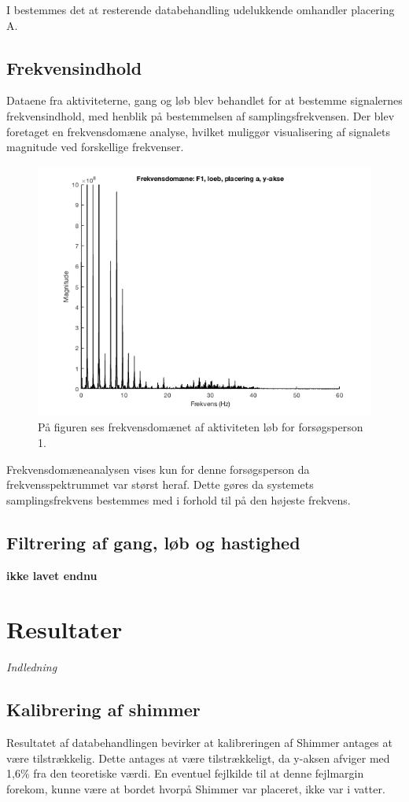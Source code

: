 I  bestemmes det at resterende databehandling udelukkende omhandler placering A.


\subsection{Frekvensindhold}
Dataene fra aktiviteterne, gang og løb blev behandlet for at bestemme signalernes frekvensindhold, med henblik på bestemmelsen af samplingsfrekvensen. Der blev foretaget en frekvensdomæne analyse, hvilket muliggør visualisering af signalets magnitude ved forskellige frekvenser. 

\begin{figure}[H]
	\centering
	\includegraphics[scale=0.55]{figures/bProblemloesning/fft_f1_loeb}
	\caption{På figuren ses frekvensdomænet af aktiviteten løb for forsøgsperson 1.}
	\label{fig:Ap_FFt}
\end{figure}
Frekvensdomæneanalysen vises kun for denne forsøgsperson da frekvensspektrummet var størst heraf. Dette gøres da systemets samplingsfrekvens bestemmes med i forhold til på den højeste frekvens.

\subsection{Filtrering af gang, løb og hastighed}
\textbf{ikke lavet endnu}

\section{Resultater}
\textit{Indledning}
\subsection{Kalibrering af shimmer}
Resultatet af databehandlingen bevirker at kalibreringen af Shimmer antages at være tilstrækkelig. Dette antages at være tilstrækkeligt, da y-aksen  afviger med 1,6\% fra den teoretiske værdi. En eventuel fejlkilde til at denne fejlmargin forekom, kunne være at bordet hvorpå Shimmer var placeret, ikke var i vatter.

